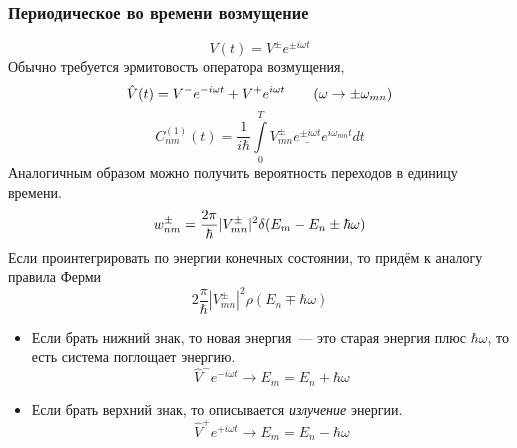 \subsubsection{Периодическое во времени возмущение}
$$V(t) = V^{\pm} e^{\pm i \omega t}$$
Обычно требуется эрмитовость оператора возмущения,
$$
    \Hat V(t) = V^{-} e^{-i \omega t} + V^{+} e^{i\omega t} \qquad (\omega \to \pm \omega_{mn})
$$
$$
    C_{nm}^{(1)} (t) = \dfrac{1}{i \hbar} \int\limits_0^T V_{mn}^{\pm} \underline{e^{\pm i \omega t}} e^{i \omega_{mn} t} dt
$$
Аналогичным образом можно получить вероятность переходов в единицу времени.
$$
    w_{nm}^{\pm} = \dfrac{2\pi}{\hbar} |V_{mn}^{\pm}|^2 \delta(E_m - E_n \pm \hbar \omega)
$$
Если проинтегрировать по энергии конечных состоянии, то придём к аналогу правила Ферми
$$
    2 \dfrac{\pi}{\hbar} |V_{mn}^{\pm}|^2 \rho(E_n \mp \hbar \omega)
$$
\begin{itemize}
  \item Если брать нижний знак, то новая энергия~--- это старая энергия плюс $\hbar \omega$, то есть система поглощает энергию.
$$
    \hat V^{-} e^{-i \omega t} \to E_m = E_n + \hbar \omega
$$
  \item Если брать верхний знак, то описывается \emph{излучение} энергии.
$$
    \hat V^{+} e^{+i \omega t} \to E_m = E_n - \hbar \omega
$$
\end{itemize}
